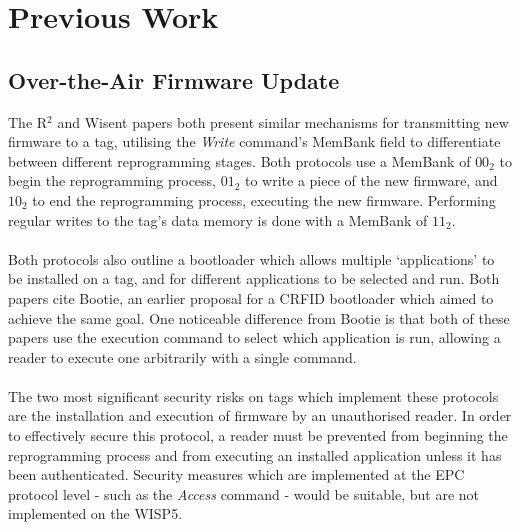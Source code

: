 \documentclass[journal]{IEEEtran}
\begin{document}
\section{Previous Work}
    \subsection{Over-the-Air Firmware Update}
        The R$^2$\cite{r2} and Wisent\cite{wisent} papers both present similar mechanisms for transmitting new firmware to a tag, utilising the \textit{Write} command's MemBank field to differentiate between different reprogramming stages.
        Both protocols use a MemBank of $00_2$ to begin the reprogramming process, $01_2$ to write a piece of the new firmware, and $10_2$ to end the reprogramming process, executing the new firmware.
        Performing regular writes to the tag's data memory is done with a MemBank of $11_2$.
        \\\\
        Both protocols also outline a bootloader which allows multiple `applications' to be installed on a tag, and for different applications to be selected and run.
        Both papers cite Bootie,\cite{bootie} an earlier proposal for a CRFID bootloader which aimed to achieve the same goal.
        One noticeable difference from Bootie is that both of these papers use the execution command to select which application is run, allowing a reader to execute one arbitrarily with a single command.
        \\\\
        The two most significant security risks on tags which implement these protocols are the installation and execution of firmware by an unauthorised reader.
        In order to effectively secure this protocol, a reader must be prevented from beginning the reprogramming process and from executing an installed application unless it has been authenticated.
        Security measures which are implemented at the EPC protocol level - such as the \textit{Access} command - would be suitable, but are not implemented on the WISP5.
\end{document}
